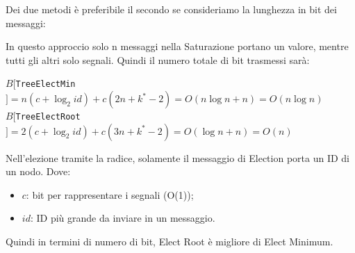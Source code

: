 Dei due metodi è preferibile il secondo se consideriamo la lunghezza in bit dei
messaggi:

In questo approccio solo n messaggi nella Saturazione portano un valore, mentre
tutti gli altri solo segnali. Quindi il numero totale di bit trasmessi sarà:
\begin{center}
    $B[$\texttt{TreeElectMin}$] = n (c + \log_2 id) + c (2n + k^* - 2) = O(n \log
        n + n) = O(n \log n)$\\
    $B[$\texttt{TreeElectRoot}$] = 2(c + \log_2 id) + c(3n + k^* - 2) = O(\log n +
        n) = O(n)$
\end{center}
Nell'elezione tramite la radice, solamente il messaggio di Election porta un ID
di un nodo. Dove:
\begin{itemize}
    \item $c$: bit per rappresentare i segnali (O(1));
    \item $id$: ID più grande da inviare in un messaggio.
\end{itemize}
Quindi in termini di numero di bit, Elect Root è migliore di Elect Minimum.
